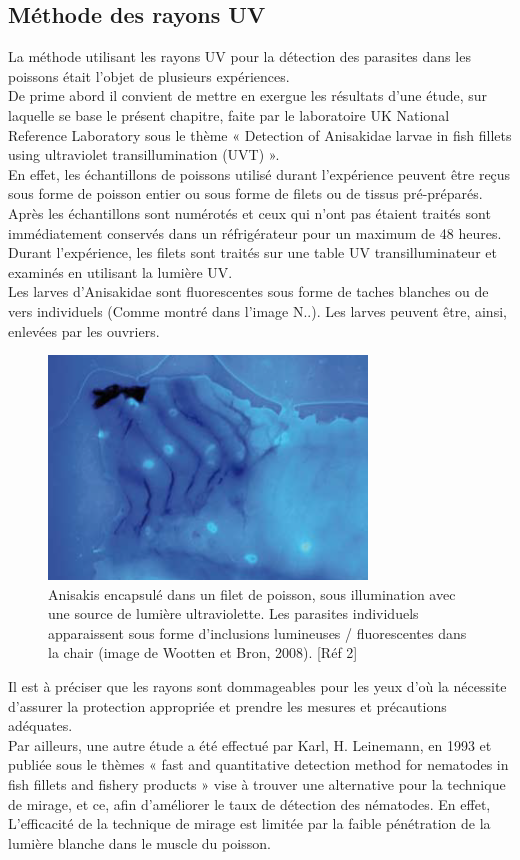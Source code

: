 \documentclass[12pt,a4paper]{article}
\begin{document}
\subsection{Méthode des rayons UV}
La méthode utilisant les rayons UV pour la détection des parasites dans les poissons était l’objet de plusieurs expériences.\\
De prime abord il convient de mettre en exergue les résultats d’une étude, sur laquelle se base le présent chapitre, faite par le laboratoire UK National Reference Laboratory sous le thème « Detection of Anisakidae larvae in fish fillets using ultraviolet transillumination (UVT) ». \\
En effet, les échantillons de poissons utilisé durant l’expérience peuvent être reçus sous forme de poisson entier ou sous forme de filets ou de tissus pré-préparés. Après les échantillons sont numérotés et ceux qui n’ont pas étaient traités sont immédiatement conservés dans un réfrigérateur pour un maximum de 48 heures. Durant l’expérience,  les filets sont traités sur une  table UV transilluminateur et examinés en utilisant la lumière UV.\\
Les larves d'Anisakidae sont fluorescentes sous forme de taches blanches ou de vers individuels (Comme montré dans l'image N..). Les larves peuvent être, ainsi, enlevées par les ouvriers.
\begin{figure}[!h]
   \center
   \includegraphics[scale=0.5]{UV.png}
   \caption {Anisakis encapsulé dans un filet de poisson, sous illumination avec une source de lumière ultraviolette. Les parasites individuels apparaissent sous forme d'inclusions lumineuses / fluorescentes dans la chair (image de Wootten et Bron, 2008). [Réf 2]}
\end{figure}
Il est à préciser que les rayons sont dommageables pour les yeux d’où la nécessite d’assurer la protection appropriée et prendre les mesures et précautions adéquates. \\
Par ailleurs, une autre étude a été effectué par Karl, H. Leinemann, en 1993 et publiée sous le thèmes «  fast and quantitative detection method for nematodes in fish fillets and fishery products » vise à trouver une alternative pour la technique de mirage, et ce, afin d’améliorer le taux de détection des nématodes. En effet, L'efficacité de la technique de mirage est limitée par la faible pénétration de la lumière blanche dans le muscle du poisson. \\
\end{document}
